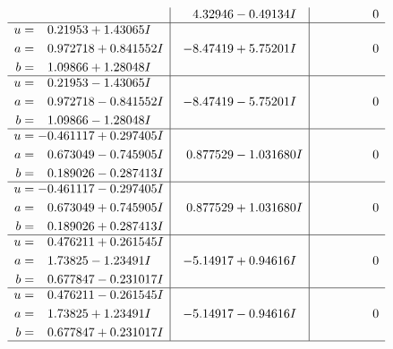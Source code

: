\documentclass[1p]{elsarticle_modified}
\theoremstyle{definition}
\begin{document}
$$\begin{array}{c|c|c}
 & \phantom{-}4.32946 - 0.49134 I & \phantom{-0.000000 } 0 \\ \hline\begin{aligned}
u &= \phantom{-}0.21953 + 1.43065 I \\
a &= \phantom{-}0.972718 + 0.841552 I \\
b &= \phantom{-}1.09866 + 1.28048 I\end{aligned}
 & -8.47419 + 5.75201 I & \phantom{-0.000000 } 0 \\ \hline\begin{aligned}
u &= \phantom{-}0.21953 - 1.43065 I \\
a &= \phantom{-}0.972718 - 0.841552 I \\
b &= \phantom{-}1.09866 - 1.28048 I\end{aligned}
 & -8.47419 - 5.75201 I & \phantom{-0.000000 } 0 \\ \hline\begin{aligned}
u &= -0.461117 + 0.297405 I \\
a &= \phantom{-}0.673049 - 0.745905 I \\
b &= \phantom{-}0.189026 - 0.287413 I\end{aligned}
 & \phantom{-}0.877529 - 1.031680 I & \phantom{-0.000000 } 0 \\ \hline\begin{aligned}
u &= -0.461117 - 0.297405 I \\
a &= \phantom{-}0.673049 + 0.745905 I \\
b &= \phantom{-}0.189026 + 0.287413 I\end{aligned}
 & \phantom{-}0.877529 + 1.031680 I & \phantom{-0.000000 } 0 \\ \hline\begin{aligned}
u &= \phantom{-}0.476211 + 0.261545 I \\
a &= \phantom{-}1.73825 - 1.23491 I \\
b &= \phantom{-}0.677847 - 0.231017 I\end{aligned}
 & -5.14917 + 0.94616 I & \phantom{-0.000000 } 0 \\ \hline\begin{aligned}
u &= \phantom{-}0.476211 - 0.261545 I \\
a &= \phantom{-}1.73825 + 1.23491 I \\
b &= \phantom{-}0.677847 + 0.231017 I\end{aligned}
 & -5.14917 - 0.94616 I & \phantom{-0.000000 } 0\\
 \hline 
 \end{array}$$\newpage$$\begin{array}{c|c|c}  

\end{array}$$
\end{document}
